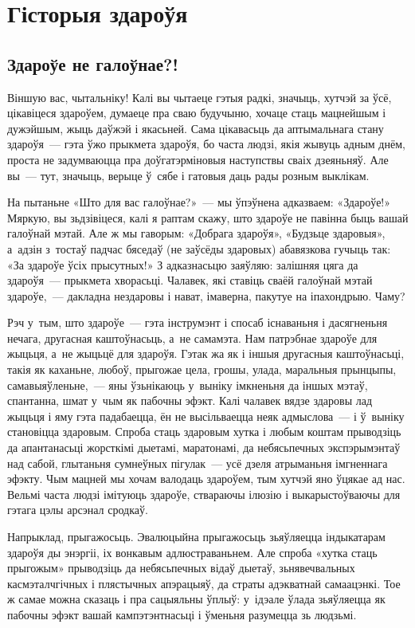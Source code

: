 \chapter{Гісторыя здароўя}

\section{Здароўе не галоўнае?!}

Віншую вас, чытальніку! Калі вы чытаеце гэтыя радкі, значыць, хутчэй за ўсё, цікавіцеся здароўем, думаеце пра сваю будучыню, хочаце стаць мацнейшым і дужэйшым, жыць даўжэй і якасьней. Сама цікавасьць да аптымальнага стану здароўя~--- гэта ўжо прыкмета здароўя, бо часта людзі, якія жывуць адным днём, проста не задумваюцца пра доўгатэрміновыя наступствы сваіх дзеяньняў. Але вы~--- тут, значыць, верыце ў~сябе і гатовыя даць рады розным выклікам.

На пытаньне «Што для вас галоўнае?»~--- мы ўпэўнена адказваем: «Здароўе!» Мяркую, вы зьдзівіцеся, калі я раптам скажу, што здароўе не павінна быць вашай галоўнай мэтай. Але ж мы гаворым: «Добрага здароўя», «Будзьце здаровыя», а~адзін з~тостаў падчас бяседаў (не заўсёды здаровых) абавязкова гучыць так: «За здароўе ўсіх прысутных!» З адказнасьцю заяўляю: залішняя цяга да здароўя~--- прыкмета хворасьці. Чалавек, які ставіць сваёй галоўнай мэтай здароўе,~--- дакладна нездаровы і нават, імаверна, пакутуе на іпахондрыю. Чаму?

Рэч у~тым, што здароўе~--- гэта інструмэнт і спосаб існаваньня і дасягненьня нечага, другасная каштоўнасьць, а~не самамэта. Нам патрэбнае здароўе для жыцьця, а~не жыцьцё для здароўя. Гэтак жа як і іншыя другасныя каштоўнасьці, такія як каханьне, любоў, прыгожае цела, грошы, улада, маральныя прынцыпы, самавыяўленьне,~--- яны ўзьнікаюць у~выніку імкненьня да іншых мэтаў, спантанна, шмат у~чым як пабочны эфэкт. Калі чалавек вядзе здаровы лад жыцьця і яму гэта падабаецца, ён не высільваецца неяк адмыслова~--- і ў~выніку становіцца здаровым. Спроба стаць здаровым хутка і любым коштам прыводзіць да апантанасьці жорсткімі дыетамі, маратонамі, да небясьпечных экспэрымэнтаў над сабой, глытаньня сумнеўных пігулак~--- усё дзеля атрыманьня імгненнага эфэкту. Чым мацней мы хочам валодаць здароўем, тым хутчэй яно ўцякае ад нас. Вельмі часта людзі імітуюць здароўе, ствараючы ілюзію і выкарыстоўваючы для гэтага цэлы арсэнал сродкаў.

Напрыклад, прыгажосьць. Эвалюцыйна прыгажосьць зьяўляецца індыкатарам здароўя ды энэргіі, іх вонкавым адлюстраваньнем. Але спроба «хутка стаць прыгожым» прыводзіць да небясьпечных відаў дыетаў, зьнявечвальных касмэталчгічных і плястычных апэрацыяў, да страты адэкватнай самаацэнкі. Тое ж самае можна сказаць і пра сацыяльны ўплыў: у~ідэале ўлада зьяўляецца як пабочны эфэкт вашай кампэтэнтнасьці і ўменьня разумецца зь людзьмі.

